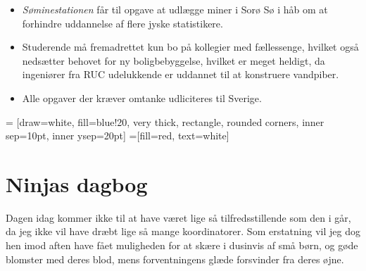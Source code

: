 \begin{minipage}[b]{0.95\linewidth}
\begin{minipage}[t]{0.47\textwidth}
\begin{itemize}
\item \emph{Søminestationen} får til opgave at udlægge miner i Sorø Sø i håb om at forhindre uddannelse af flere jyske statistikere.
\item Studerende må fremadrettet kun bo på kollegier med fællessenge, hvilket også nedsætter behovet for ny boligbebyggelse, hvilket er meget heldigt, da ingeniører fra RUC udelukkende er uddannet til at konstruere vandpiber.
\item Alle opgaver der kræver omtanke udliciteres til Sverige.
\end{itemize}

\end{minipage}
\hfill\begin{minipage}[t]{0.47\textwidth}

\vspace{1mm}
 = [draw=white, fill=blue!20, very thick,
    rectangle, rounded corners, inner sep=10pt, inner ysep=20pt]
 =[fill=red, text=white]

%

\section*{Ninjas dagbog}
Dagen idag kommer ikke til  at have været lige så tilfredsstillende som den i går, da jeg ikke vil have dræbt lige så mange koordinatorer. Som erstatning vil jeg dog hen imod aften have fået muligheden for at skære i dusinvis af små børn, og gøde blomster med deres blod, mens forventningens glæde forsvinder fra deres øjne.


\end{minipage}
\end{minipage}
